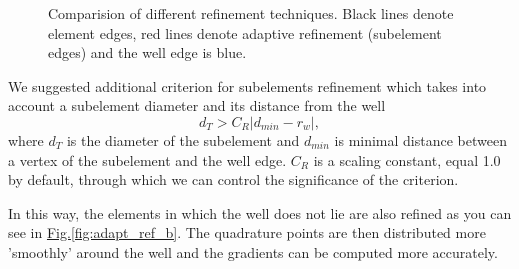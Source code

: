 \documentclass[preprint,12pt,authoryear]{elsarticle}
\newcommand{\fig}[1]{\hyperref[#1]{Fig.\ref{#1}}}
\begin{document}
\begin{figure}[!htb]
  \centering    
  \hspace{0pt}
  \caption[Adaptive refinement comparision]
  {Comparision of different refinement techniques.
   Black lines denote element edges, red lines denote adaptive refinement (subelement edges) and the well
   edge is blue.
  }
  \label{fig:adapt_refinement}
\end{figure}

We suggested additional criterion for subelements refinement which takes into account a subelement diameter 
and its distance from the well
\begin{equation}
  d_T > C_R|d_{min} - r_w|,
\end{equation}
where $d_T$ is the diameter of the subelement and $d_{min}$ is minimal distance between a vertex of 
the subelement and the well edge. $C_R$ is a scaling constant, equal 1.0 by default, through which we can 
control the significance of the criterion.

In this way, the elements in which the well does not lie are also refined as you can see in 
\fig{fig:adapt_ref_b}. The quadrature points are then distributed more 'smoothly' around the well and the
gradients can be computed more accurately. 
\end{document}
